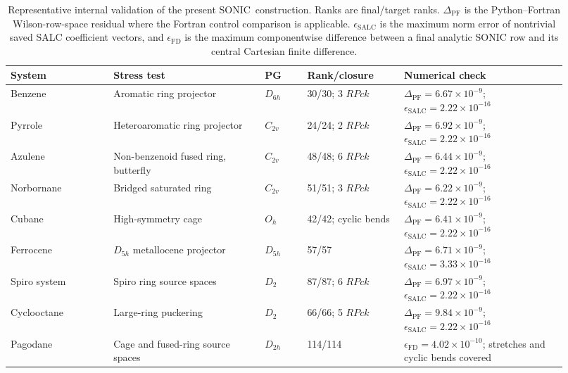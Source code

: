 \documentclass[journal=jctcce,manuscript=article,layout=traditional]{achemso}
\newcommand{\SONIC}{SONIC}
\theoremstyle{definition}
\begin{document}
\begin{table}[htbp]
\centering
\scriptsize
\setlength{\tabcolsep}{3pt}
\caption{Representative internal validation of the present \SONIC\ construction.
Ranks are final/target ranks.  \(\Delta_\mathrm{PF}\) is the Python--Fortran
Wilson-row-space residual where the Fortran control comparison is applicable.
\(\epsilon_\mathrm{SALC}\) is the maximum norm error of nontrivial saved SALC
coefficient vectors, and \(\epsilon_\mathrm{FD}\) is the maximum componentwise
difference between a final analytic SONIC row and its central Cartesian finite
difference.}
\label{tab:validation}
\begin{tabular}{@{}p{0.17\linewidth}p{0.25\linewidth}p{0.07\linewidth}p{0.16\linewidth}p{0.27\linewidth}@{}}
\toprule
System & Stress test & PG & Rank/closure & Numerical check \\
\midrule
Benzene & Aromatic ring projector & \(D_{6h}\) & 30/30; 3 \(RPck\) & \(\Delta_\mathrm{PF}=6.67\times10^{-9}\); \(\epsilon_\mathrm{SALC}=2.22\times10^{-16}\) \\
Pyrrole & Heteroaromatic ring projector & \(C_{2v}\) & 24/24; 2 \(RPck\) & \(\Delta_\mathrm{PF}=6.92\times10^{-9}\); \(\epsilon_\mathrm{SALC}=2.22\times10^{-16}\) \\
Azulene & Non-benzenoid fused ring, butterfly & \(C_{2v}\) & 48/48; 6 \(RPck\) & \(\Delta_\mathrm{PF}=6.44\times10^{-9}\); \(\epsilon_\mathrm{SALC}=2.22\times10^{-16}\) \\
Norbornane & Bridged saturated ring & \(C_{2v}\) & 51/51; 3 \(RPck\) & \(\Delta_\mathrm{PF}=6.22\times10^{-9}\); \(\epsilon_\mathrm{SALC}=2.22\times10^{-16}\) \\
Cubane & High-symmetry cage & \(O_h\) & 42/42; cyclic bends & \(\Delta_\mathrm{PF}=6.41\times10^{-9}\); \(\epsilon_\mathrm{SALC}=2.22\times10^{-16}\) \\
Ferrocene & \(D_{5h}\) metallocene projector & \(D_{5h}\) & 57/57 & \(\Delta_\mathrm{PF}=6.71\times10^{-9}\); \(\epsilon_\mathrm{SALC}=3.33\times10^{-16}\) \\
Spiro system & Spiro ring source spaces & \(D_2\) & 87/87; 6 \(RPck\) & \(\Delta_\mathrm{PF}=6.97\times10^{-9}\); \(\epsilon_\mathrm{SALC}=2.22\times10^{-16}\) \\
Cyclooctane & Large-ring puckering & \(D_2\) & 66/66; 5 \(RPck\) & \(\Delta_\mathrm{PF}=9.84\times10^{-9}\); \(\epsilon_\mathrm{SALC}=2.22\times10^{-16}\) \\
Pagodane & Cage and fused-ring source spaces & \(D_{2h}\) & 114/114 & \(\epsilon_\mathrm{FD}=4.02\times10^{-10}\); stretches and cyclic bends covered \\

\end{tabular}
\end{table}
\end{document}
